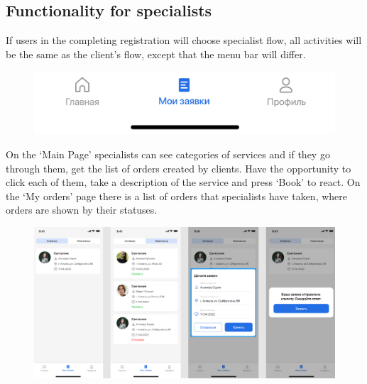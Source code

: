 \subsection{Functionality for specialists}
\hspace{10mm}If users in the completing registration will choose specialist flow, all activities will be the same as the client's flow, except that the menu bar will differ.
\begin{figure}[H]
    \centering
    \includegraphics[scale=0.75]{images/func8.png}
\end{figure}
On the ‘Main Page’ specialists can see categories of services and if they go through them, get the list of orders created by clients. Have the opportunity to click each of them, take a description of the service and press ‘Book’ to react. On the ‘My orders’ page there is a list of orders that specialists have taken, where orders are shown by their statuses.
\begin{figure}[H]
    \centering
    \includegraphics[scale=0.65]{images/func9.png}
\end{figure}
